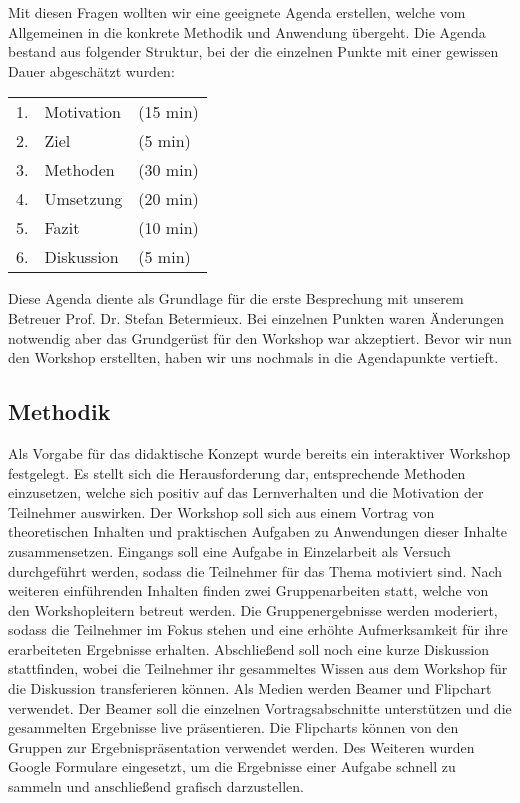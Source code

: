 Mit diesen Fragen wollten wir eine geeignete Agenda erstellen, welche vom Allgemeinen in die konkrete Methodik und Anwendung übergeht. Die Agenda bestand aus folgender Struktur, bei der die einzelnen Punkte mit einer gewissen Dauer abgeschätzt wurden:

\begin{center}
	\begin{tabular}{r l  l}
		1.&Motivation	&(15 min) \\
		2.&Ziel		&	(5 min) \\
		3.&Methoden	&	(30 min) \\
		4.&Umsetzung	&	(20 min) \\ 
		5.&Fazit		&	(10 min) \\
		6.&Diskussion	&(5 min) \\
	\end{tabular}
\end{center}

Diese Agenda diente als Grundlage für die erste Besprechung mit unserem Betreuer Prof. Dr. Stefan Betermieux. Bei einzelnen Punkten waren Änderungen notwendig aber das Grundgerüst für den Workshop war akzeptiert. Bevor wir nun den Workshop erstellten, haben wir uns nochmals in die Agendapunkte vertieft. 


\subsection{Methodik}  
Als Vorgabe für das didaktische Konzept wurde bereits ein interaktiver Workshop festgelegt. Es stellt sich die Herausforderung dar, entsprechende Methoden einzusetzen, welche sich positiv auf das Lernverhalten und die Motivation der Teilnehmer auswirken. Der Workshop soll sich aus einem Vortrag von theoretischen Inhalten und praktischen Aufgaben zu Anwendungen dieser Inhalte zusammensetzen. Eingangs soll eine  Aufgabe in Einzelarbeit als Versuch durchgeführt werden, sodass die Teilnehmer für das Thema motiviert sind. Nach weiteren einführenden Inhalten finden zwei Gruppenarbeiten statt, welche von den Workshopleitern betreut werden. Die Gruppenergebnisse werden moderiert, sodass die Teilnehmer im Fokus stehen und eine erhöhte Aufmerksamkeit für ihre erarbeiteten Ergebnisse erhalten. Abschließend soll noch eine kurze Diskussion stattfinden, wobei die Teilnehmer ihr gesammeltes Wissen aus dem Workshop für die Diskussion transferieren können. Als Medien werden Beamer und Flipchart verwendet. Der Beamer soll die einzelnen Vortragsabschnitte unterstützen und die gesammelten Ergebnisse live präsentieren. Die Flipcharts können von den Gruppen zur Ergebnispräsentation verwendet werden. Des Weiteren wurden Google Formulare eingesetzt, um die Ergebnisse einer Aufgabe schnell zu sammeln und anschließend grafisch darzustellen.



